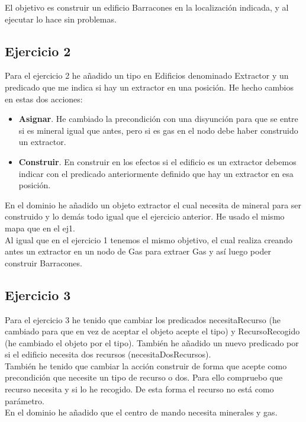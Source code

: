 \documentclass[a4paper,11pt]{article}
\begin{document}
El objetivo es construir un edificio Barracones en la localización indicada, y al ejecutar lo hace sin problemas.

\subsection{Ejercicio 2}

Para el ejercicio 2 he añadido un tipo en Edificios denominado Extractor y un predicado que me indica si hay un extractor en una posición. He hecho cambios en estas dos acciones:

\begin{itemize}
\item \textbf{Asignar}. He cambiado la precondición con una disyunción para que se entre si es mineral igual que antes, pero si es gas en el nodo debe haber construido un extractor.
\item \textbf{Construir}. En construir en los efectos si el edificio es un extractor debemos indicar con el predicado anteriormente definido que hay un extractor en esa posición.
\end{itemize}

En el dominio he añadido un objeto extractor el cual necesita de mineral para ser construido y lo demás todo igual que el ejercicio anterior. He usado el mismo mapa que en el ej1.\\

Al igual que en el ejercicio 1 tenemos el mismo objetivo, el cual realiza creando antes un extractor en un nodo de Gas para extraer Gas y así luego poder construir Barracones.

\subsection{Ejercicio 3}

Para el ejercicio 3 he tenido que cambiar los predicados necesitaRecurso (he cambiado para que en vez de aceptar el objeto acepte el tipo) y RecursoRecogido (he cambiado el objeto por el tipo). También he añadido un nuevo predicado por si el edificio necesita dos recursos (necesitaDosRecursos).\\

También he tenido que cambiar la acción construir de forma que acepte como precondición que necesite un tipo de recurso o dos. Para ello compruebo que recurso necesita y si lo he recogido. De esta forma el recurso no está como parámetro.\\

En el dominio he añadido que el centro de mando necesita minerales y gas.\\
\end{document}

